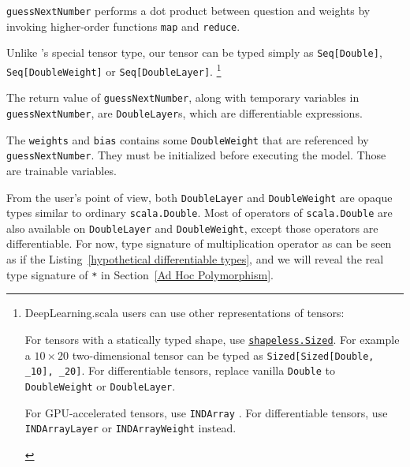 \lstinline{guessNextNumber} performs a dot product between question and weights by invoking higher-order functions \lstinline{map} and \lstinline{reduce}. 

Unlike \cite{chen2017typesafe}'s special tensor type, our tensor can be typed simply as \lstinline{Seq[Double]}, \lstinline{Seq[DoubleWeight]} or \lstinline{Seq[DoubleLayer]}.
\footnote{DeepLearning.scala users can use other representations of tensors:
\begin{enumerate*}
  \item For tensors with a statically typed shape, use \href{https://javadoc.io/page/com.chuusai/shapeless_2.11/latest/shapeless/Sized.html}{ \lstinline{shapeless.Sized}}. For example a $10\times20$ two-dimensional tensor can be typed as \lstinline{Sized[Sized[Double, _10], _20]}. For differentiable tensors, replace vanilla \lstinline{Double} to \lstinline{DoubleWeight} or \lstinline{DoubleLayer}.
  \item For GPU-accelerated tensors, use \lstinline{INDArray} \cite{skymind2017nd4j}. For differentiable tensors, use \lstinline{INDArrayLayer} or \lstinline{INDArrayWeight} instead.
\end{enumerate*}
}

The return value of \lstinline{guessNextNumber}, along with temporary variables in \lstinline{guessNextNumber}, are \lstinline{DoubleLayer}s, which are \glspl{differentiable expression}.

The \lstinline{weights} and \lstinline{bias} contains some \lstinline{DoubleWeight} that are referenced by \lstinline{guessNextNumber}.
They must be initialized before executing the model. Those are \glspl{trainable variable}.

From the user's point of view, both \lstinline{DoubleLayer} and \lstinline{DoubleWeight} are opaque types similar to ordinary \lstinline{scala.Double}. Most of operators of \lstinline{scala.Double} are also available on \lstinline{DoubleLayer}  and \lstinline{DoubleWeight}, except those operators are differentiable. For now, type signature of multiplication operator as can be seen as if the Listing~\ref{hypothetical differentiable types}, and we will reveal the real type signature of \lstinline{*} in Section~\ref{Ad Hoc Polymorphism}.

